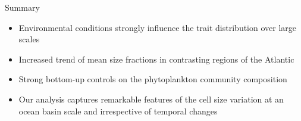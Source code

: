 \documentclass{beamer}
\begin{document}
\begin{frame}{Summary}

\begin{itemize}

\item Environmental conditions strongly influence the trait distribution over large scales

\pause

\item Increased trend of mean size fractions in contrasting regions of the Atlantic

\pause

\item Strong bottom-up controls on the phytoplankton community composition

\pause

\item Our analysis captures remarkable features of the cell size variation at an ocean basin scale and irrespective of temporal changes

\end{itemize}

\end{frame}
\end{document}
